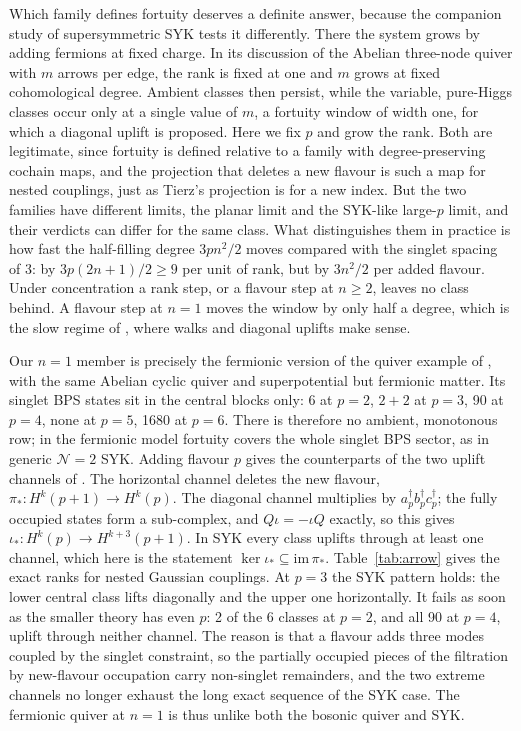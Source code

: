 \documentclass[10pt]{article}
\begin{document}
Which family defines fortuity deserves a definite answer, because the companion study of supersymmetric SYK
\cite{CV} tests it differently. There the system grows by adding fermions at fixed charge. In its discussion of the
Abelian three-node quiver with $m$ arrows per edge, the rank is fixed at one and $m$ grows at fixed cohomological
degree. Ambient classes then persist, while the variable, pure-Higgs classes occur only at a single value of $m$, a
fortuity window of width one, for which a diagonal uplift is proposed. Here we fix $p$ and grow the rank. Both are
legitimate, since fortuity is defined relative to a family with degree-preserving cochain maps, and the projection
that deletes a new flavour is such a map for nested couplings, just as Tierz's projection is for a new index. But the
two families have different limits, the planar limit and the SYK-like large-$p$ limit, and their verdicts can differ
for the same class. What distinguishes them in practice is how fast the half-filling degree $3pn^2/2$ moves compared
with the singlet spacing of 3: by $3p(2n+1)/2\ge9$ per unit of rank, but by $3n^2/2$ per added flavour. Under
concentration a rank step, or a flavour step at $n\ge2$, leaves no class behind. A flavour step at $n=1$ moves the
window by only half a degree, which is the slow regime of \cite{CV}, where walks and diagonal uplifts make sense.

Our $n=1$ member is precisely the fermionic version of the quiver example of \cite{CV}, with the same Abelian cyclic
quiver and superpotential but fermionic matter. Its singlet BPS states sit in the central blocks only: 6 at $p=2$,
$2+2$ at $p=3$, 90 at $p=4$, none at $p=5$, 1680 at $p=6$. There is therefore no ambient, monotonous row; in the
fermionic model fortuity covers the whole singlet BPS sector, as in generic $\mathcal N=2$ SYK. Adding flavour $p$
gives the counterparts of the two uplift channels of \cite{CV}. The horizontal channel deletes the new flavour,
$\pi_*:H^k(p+1)\to H^k(p)$. The diagonal channel multiplies by $a_p^\dagger b_p^\dagger c_p^\dagger$; the fully occupied
states form a sub-complex, and $Q\iota=-\iota Q$ exactly, so this gives $\iota_*:H^k(p)\to H^{k+3}(p+1)$. In SYK every
class uplifts through at least one channel, which here is the statement $\ker\iota_*\subseteq\mathrm{im}\,\pi_*$.
Table~\ref{tab:arrow} gives the exact ranks for nested Gaussian couplings. At $p=3$ the SYK pattern holds: the lower
central class lifts diagonally and the upper one horizontally. It fails as soon as the smaller theory has even $p$:
2 of the 6 classes at $p=2$, and all 90 at $p=4$, uplift through neither channel. The reason is that a flavour adds
three modes coupled by the singlet constraint, so the partially occupied pieces of the filtration by new-flavour
occupation carry non-singlet remainders, and the two extreme channels no longer exhaust the long exact sequence of
the SYK case. The fermionic quiver at $n=1$ is thus unlike both the bosonic quiver and SYK.
\end{document}
